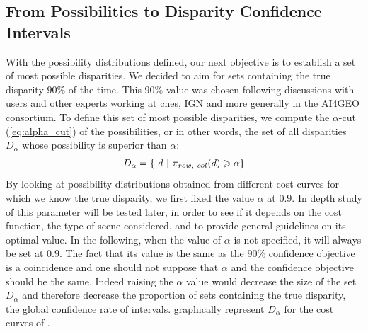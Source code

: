 \subsection{From Possibilities to Disparity Confidence Intervals}
With the possibility distributions defined, our next objective is to establish a set of most possible disparities. We decided to aim for sets containing the true disparity $90\%$ of the time. This $90\%$ value was chosen following discussions with users and other experts working at \acrshort{cnes}, IGN and more generally in the AI4GEO consortium. To define this set of most possible disparities, we compute the $\alpha$-cut (\cref{eq:alpha_cut}) of the possibilities, or in other words, the set of all disparities $D_\alpha$ whose possibility is superior than $\alpha$:
\begin{align}
    D_\alpha=\{~ d ~|~ \pi_{row, ~col}(d)\geqslant\alpha\}\label{eq:set_of_possible_disparities}
\end{align}
By looking at possibility distributions obtained from different cost curves for which we know the true disparity, we first fixed the value $\alpha$ at $0.9$. In depth study of this parameter will be tested later, in order to see if it depends on the cost function, the type of scene considered, and to provide general guidelines on its optimal value. In the following, when the value of $\alpha$ is not specified, it will always be set at $0.9$. The fact that its value is the same as the $90\%$ confidence objective is a coincidence and one should not suppose that $\alpha$ and the confidence objective should be the same. Indeed raising the $\alpha$ value would decrease the size of the set $D_\alpha$ and therefore decrease the proportion of sets containing the true disparity, \ie the global confidence rate of intervals.  graphically represent $D_\alpha$ for the cost curves of .

